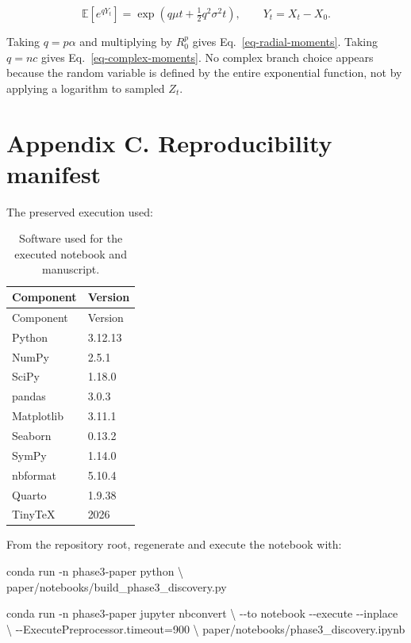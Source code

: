 \documentclass[
  english,
  10pt,
  letterpaper,
  DIV=11,
  numbers=noendperiod]{scrartcl}
\newenvironment{Shaded}{\begin{snugshade}}{\end{snugshade}}
\newcommand{\AttributeTok}[1]{\textcolor[rgb]{0.40,0.45,0.13}{#1}}
\newcommand{\DataTypeTok}[1]{\textcolor[rgb]{0.68,0.00,0.00}{#1}}
\newcommand{\ExtensionTok}[1]{\textcolor[rgb]{0.00,0.23,0.31}{#1}}
\newcommand{\NormalTok}[1]{\textcolor[rgb]{0.00,0.23,0.31}{#1}}
\newcommand{\OperatorTok}[1]{\textcolor[rgb]{0.37,0.37,0.37}{#1}}
\theoremstyle{plain}
\theoremstyle{remark}
\begin{document}
\[
\mathbb E[e^{qY_t}]
=\exp\!\left(q\mu t+\tfrac12q^2\sigma^2t\right),
\qquad Y_t=X_t-X_0.
\]

Taking \(q=p\alpha\) and multiplying by \(R_0^p\) gives
Eq.~\ref{eq-radial-moments}. Taking \(q=nc\) gives
Eq.~\ref{eq-complex-moments}. No complex branch choice appears because
the random variable is defined by the entire exponential function, not
by applying a logarithm to sampled \(Z_t\).

\section{Appendix C. Reproducibility
manifest}\label{sec-reproducibility}

The preserved execution used:

\begin{longtable}[]{@{}ll@{}}
\caption{Software used for the executed notebook and
manuscript.}\label{tbl-software}\tabularnewline
\toprule\noalign{}
Component & Version \\
\midrule\noalign{}
\endfirsthead
\toprule\noalign{}
Component & Version \\
\midrule\noalign{}
\endhead
\bottomrule\noalign{}
\endlastfoot
Python & 3.12.13 \\
NumPy & 2.5.1 \\
SciPy & 1.18.0 \\
pandas & 3.0.3 \\
Matplotlib & 3.11.1 \\
Seaborn & 0.13.2 \\
SymPy & 1.14.0 \\
nbformat & 5.10.4 \\
Quarto & 1.9.38 \\
TinyTeX & 2026 \\
\end{longtable}

From the repository root, regenerate and execute the notebook with:

\begin{Shaded}
\begin{Highlighting}[]
\ExtensionTok{conda}\NormalTok{ run }\AttributeTok{{-}n}\NormalTok{ phase3{-}paper python }\DataTypeTok{\textbackslash{}}
\NormalTok{  paper/notebooks/build\_phase3\_discovery.py}

\ExtensionTok{conda}\NormalTok{ run }\AttributeTok{{-}n}\NormalTok{ phase3{-}paper jupyter nbconvert }\DataTypeTok{\textbackslash{}}
  \AttributeTok{{-}{-}to}\NormalTok{ notebook }\AttributeTok{{-}{-}execute} \AttributeTok{{-}{-}inplace} \DataTypeTok{\textbackslash{}}
  \AttributeTok{{-}{-}ExecutePreprocessor.timeout}\OperatorTok{=}\NormalTok{900 }\DataTypeTok{\textbackslash{}}
\NormalTok{  paper/notebooks/phase3\_discovery.ipynb}
\end{Highlighting}
\end{Shaded}
\end{document}
